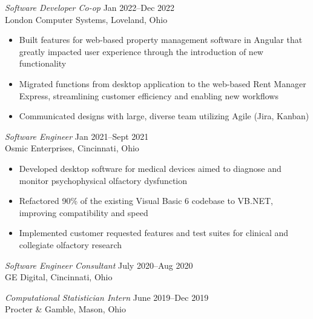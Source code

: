 \documentclass[margin]{res} %
\begin{document}
\begin{resume}
{\sl Software Developer Co-op} \hfill {\color{black} Jan 2022–Dec 2022}  \\
London Computer Systems, Loveland, Ohio 
\vspace{1mm}
\begin{itemize}  %
\item Built features for web-based property management software in Angular that greatly impacted user experience through the introduction of new functionality
\item Migrated functions from desktop application to the web-based Rent Manager Express, streamlining customer efficiency and enabling new workflows
\item Communicated designs with large, diverse team utilizing Agile (Jira, Kanban)
\end{itemize}


{\sl Software Engineer} \hfill {\color{black} Jan 2021–Sept 2021}  \\
Osmic Enterprises, Cincinnati, Ohio
\vspace{1mm}
\begin{itemize} %
\item Developed desktop software for medical devices aimed to diagnose and monitor psychophysical olfactory dysfunction
\item Refactored 90\% of the existing Visual Basic 6 codebase to VB.NET, improving compatibility and speed   
\item Implemented customer requested features and test suites for clinical and collegiate olfactory research
\end{itemize}


{\sl Software Engineer Consultant} \hfill {\color{black} July 2020–Aug 2020}  \\
GE Digital, Cincinnati, Ohio 

{\sl Computational Statistician Intern} \hfill {\color{black} June 2019–Dec 2019}  \\
Procter \& Gamble, Mason, Ohio 

\pagebreak



\end{resume}
\end{document}
